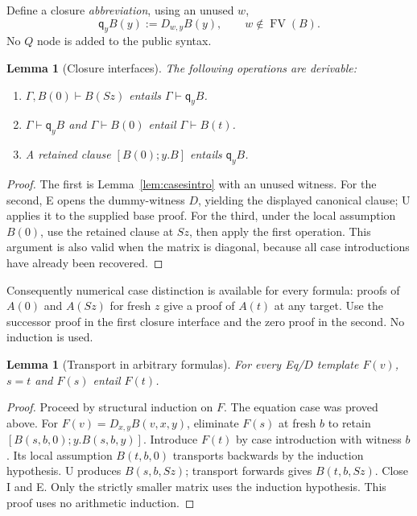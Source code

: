 \documentclass[11pt]{article}
\newtheorem{lemma}[theorem]{Lemma}
\theoremstyle{definition}\newtheorem{definition}[theorem]{Definition}
\theoremstyle{remark}\newtheorem{remark}[theorem]{Remark}
\newcommand{\FV}{\operatorname{FV}}
\newcommand{\qq}{\mathsf q}
\begin{document}
Define a closure \emph{abbreviation}, using an unused $w$,
\begin{equation}\label{eq:qmacro}
 \qq_y B(y):=D_{w,y}B(y),\qquad w\notin\FV(B).
\end{equation}
No $Q$ node is added to the public syntax.

\begin{lemma}[Closure interfaces]\label{lem:closure}
The following operations are derivable:
\begin{enumerate}
\item $\Gamma,B(0)\vdash B(Sz)$ entails $\Gamma\vdash\qq_yB$.
\item $\Gamma\vdash\qq_yB$ and $\Gamma\vdash B(0)$ entail $\Gamma\vdash B(t)$.
\item A retained clause $[B(0);y.B]$ entails $\qq_yB$.
\end{enumerate}
\end{lemma}
\begin{proof}
The first is Lemma~\ref{lem:casesintro} with an unused witness. For the second, E opens the dummy-witness $D$, yielding the displayed canonical clause; U applies it to the supplied base proof. For the third, under the local assumption $B(0)$, use the retained clause at $Sz$, then apply the first operation. This argument is also valid when the matrix is diagonal, because all case introductions have already been recovered.
\end{proof}

Consequently numerical case distinction is available for every formula: proofs of $A(0)$ and $A(Sz)$ for fresh $z$ give a proof of $A(t)$ at any target. Use the successor proof in the first closure interface and the zero proof in the second. No induction is used.

\begin{lemma}[Transport in arbitrary formulas]\label{lem:formula-transport}
For every Eq/$D$ template $F(v)$, $s=t$ and $F(s)$ entail $F(t)$.
\end{lemma}
\begin{proof}
Proceed by structural induction on $F$. The equation case was proved above. For $F(v)=D_{x,y}B(v,x,y)$, eliminate $F(s)$ at fresh $b$ to retain
$[B(s,b,0);y.B(s,b,y)]$. Introduce $F(t)$ by case introduction with witness $b$. Its local assumption $B(t,b,0)$ transports backwards by the induction hypothesis. U produces $B(s,b,Sz)$; transport forwards gives $B(t,b,Sz)$. Close I and E. Only the strictly smaller matrix uses the induction hypothesis. This proof uses no arithmetic induction.
\end{proof}
\end{document}
